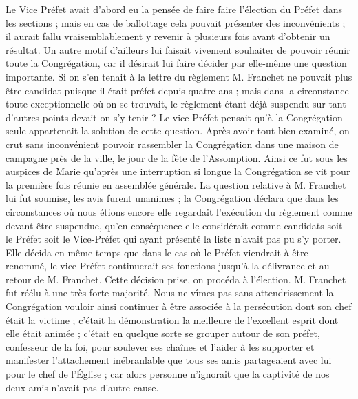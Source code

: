 Le Vice Préfet avait d'abord eu la pensée de faire faire l'élection du Préfet dans les sections ; mais en cas de ballottage cela pouvait présenter des inconvénients ; il aurait fallu vraisemblablement y revenir à plusieurs fois avant d'obtenir un résultat. Un autre motif d'ailleurs lui faisait vivement souhaiter de pouvoir réunir toute la Congrégation, car il désirait lui faire décider par elle-même une question importante. Si on s'en tenait à la lettre du règlement M. Franchet ne pouvait plus être candidat puisque il était préfet depuis quatre ans ; mais dans la circonstance toute exceptionnelle où on se trouvait, le règlement étant déjà suspendu sur tant d'autres points devait-on s'y tenir ? Le vice-Préfet pensait qu'à la Congrégation seule appartenait la solution de
cette question. Après avoir tout bien examiné, on crut sans inconvénient pouvoir rassembler la Congrégation dans une maison de campagne près de la ville, le jour de la fête de l'Assomption. Ainsi ce fut sous les auspices de Marie qu'après une interruption si longue la Congrégation se vit pour la première fois réunie en assemblée générale. La question relative à M. Franchet lui fut soumise, les avis furent unanimes ; la Congrégation déclara que dans les circonstances où nous étions encore elle regardait l'exécution du règlement comme devant être suspendue, qu'en conséquence elle considérait comme candidats soit le Préfet soit le Vice-Préfet qui ayant présenté la liste n'avait pas pu s'y porter. Elle décida en même temps que dans le cas où le Préfet viendrait à être renommé, le vice-Préfet continuerait ses fonctions jusqu'à la délivrance et au retour de M. Franchet. Cette décision prise, on procéda à l'élection. M. Franchet fut réélu à une très forte majorité. Nous ne vîmes pas sans attendrissement la Congrégation vouloir ainsi continuer à être associée à la persécution dont son chef était la victime ; c'était la démonstration la meilleure de l'excellent esprit dont elle était animée ; c'était en quelque sorte se grouper autour de son préfet, confesseur de la foi, pour soulever ses chaînes et l'aider à les supporter et manifester l'attachement inébranlable que tous ses amis partageaient avec lui pour le chef de l'Église ; car alors personne n'ignorait que la captivité de nos deux amis n'avait pas d'autre cause.

